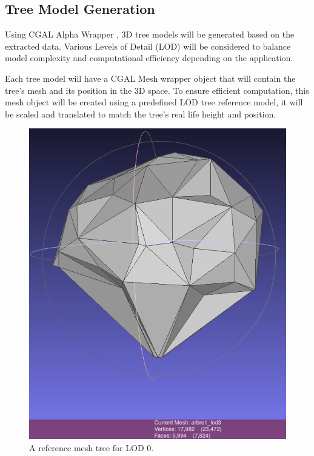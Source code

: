 \documentclass[12pt]{article}
\begin{document}
\subsection{Tree Model Generation}
Using CGAL Alpha Wrapper \cite{cgal_alpha_wrapper}, 3D tree models will be generated based on the extracted data. Various 
Levels of Detail (LOD) will be considered to balance model complexity and computational 
efficiency depending on the application.

Each tree model will have a CGAL Mesh wrapper object that will contain the tree's
mesh and its position in the 3D space. To ensure efficient computation, this 
mesh object will be created using a predefined LOD tree reference model, it will
be scaled and translated to match the tree's real life height and position.

\begin{figure}[H]
    \centering
    \begin{minipage}{0.45\textwidth}
        \centering
        \includegraphics[width=\textwidth]{images/lod0.png}
        \caption{A reference mesh tree for LOD 0.}

\end{minipage}
\end{figure}
\end{document}
